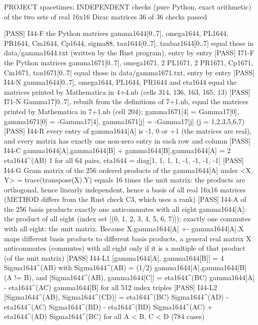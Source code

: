 \documentclass[
  10pt,
]{article}
\newenvironment{Shaded}{}{}
\newcommand{\NormalTok}[1]{#1}
\begin{document}
\begin{Shaded}
\begin{Highlighting}[]
\NormalTok{PROJECT spacetimes: INDEPENDENT checks (pure Python, exact arithmetic) of the two sets of real 16x16 Dirac matrices}
\NormalTok{36 of 36 checks passed}

\NormalTok{[PASS] I44{-}F   the Python matrices gamma1644[0..7], omega1644, PL1644, PR1644, Cm1644, Cp1644, sigma88, tau1644[0..7], taubar1644[0..7] equal those in data/gamma1644.txt (written by the Rust program), entry by entry}
\NormalTok{[PASS] I71{-}F   the Python matrices gamma1671[0..7], omega1671, 2 PL1671, 2 PR1671, Cp1671, Cm1671, tau1671[0..7] equal those in data/gamma1671.txt, entry by entry}
\NormalTok{[PASS] I44{-}N   gamma1644[0..7], omega1644, PL1644, PR1644 and eta1644 equal the matrices printed by Mathematica in 4+4.nb (cells 314, 136, 163, 165, 13)}
\NormalTok{[PASS] I71{-}N   Gamma17[0..7], rebuilt from the definitions of 7+1.nb, equal the matrices printed by Mathematica in 7+1.nb (cell 204); gamma1671[4] = Gamma17[0], gamma1671[0] = {-}Gamma17[4], gamma1671[j] = {-}Gamma17[j] (j = 1,2,3,5,6,7)}
\NormalTok{[PASS] I44{-}R   every entry of gamma1644[A] is {-}1, 0 or +1 (the matrices are real), and every matrix has exactly one non{-}zero entry in each row and column}
\NormalTok{[PASS] I44{-}C   gamma1644[A].gamma1644[B] + gamma1644[B].gamma1644[A] = 2 eta1644\^{}(AB) 1 for all 64 pairs, eta1644 = diag[1, 1, 1, 1, {-}1, {-}1, {-}1, {-}1]}
\NormalTok{[PASS] I44{-}G   Gram matrix of the 256 ordered products of the gamma1644[A] under \textless{}X, Y\textgreater{} = trace(transpose(X).Y) equals 16 times the unit matrix: the products are orthogonal, hence linearly independent, hence a basis of all real 16x16 matrices (METHOD differs from the Rust check C3, which uses a rank)}
\NormalTok{[PASS] I44{-}A   of the 256 basis products exactly one anticommutes with all eight gamma1644[A]: the product of all eight (index set [(0, 1, 2, 3, 4, 5, 6, 7)]); exactly one commutes with all eight: the unit matrix.  Because X.gamma1644[A] +{-} gamma1644[A].X maps different basis products to different basis products, a general real matrix X anticommutes (commutes) with all eight only if it is a multiple of that product (of the unit matrix)}
\NormalTok{[PASS] I44{-}L1  [gamma1644[A], gamma1644[B]] = 4 Sigma1644\^{}(AB) with Sigma1644\^{}(AB) = (1/2) gamma1644[A].gamma1644[B] (A != B), and [Sigma1644\^{}(AB), gamma1644[C]] = eta1644\^{}(BC) gamma1644[A] {-} eta1644\^{}(AC) gamma1644[B] for all 512 index triples}
\NormalTok{[PASS] I44{-}L2  [Sigma1644\^{}(AB), Sigma1644\^{}(CD)] = eta1644\^{}(BC) Sigma1644\^{}(AD) {-} eta1644\^{}(AC) Sigma1644\^{}(BD) {-} eta1644\^{}(BD) Sigma1644\^{}(AC) + eta1644\^{}(AD) Sigma1644\^{}(BC) for all A \textless{} B, C \textless{} D (784 cases)}

\end{Highlighting}
\end{Shaded}
\end{document}
